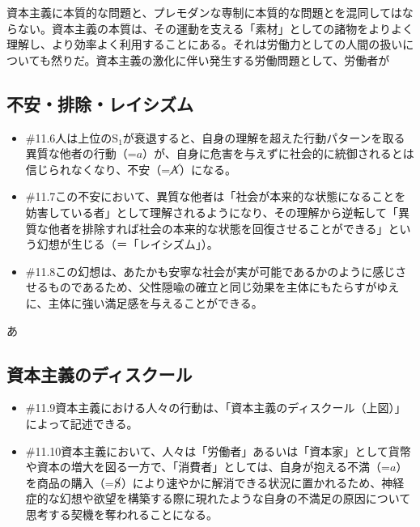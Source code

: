 資本主義に本質的な問題と、プレモダンな専制に本質的な問題とを混同してはならない。資本主義の本質は、その運動を支える「素材」としての諸物をよりよく理解し、より効率よく利用することにある。それは労働力としての人間の扱いについても然りだ。資本主義の激化に伴い発生する労働問題として、労働者が

\subsection{不安・排除・レイシズム}\label{ux4e0dux5b89ux6392ux9664ux30ecux30a4ux30b7ux30baux30e0}

\begin{note}{}
  \begin{itemize}
    \tightlist
    \item{\#11.6}人は上位の$\textrm{S}_1$が衰退すると、自身の理解を超えた行動パターンを取る異質な他者の行動（=$a$）が、自身に危害を与えずに社会的に統御されるとは信じられなくなり、不安（=$\cancel{\textrm{A}}$）になる。
    \item{\#11.7}この不安において、異質な他者は「社会が本来的な状態になることを妨害している者」として理解されるようになり、その理解から逆転して「異質な他者を排除すれば社会の本来的な状態を回復させることができる」という幻想が生じる（＝「レイシズム」）。
    \item{\#11.8}この幻想は、あたかも安寧な社会が実が可能であるかのように感じさせるものであるため、父性隠喩の確立と同じ効果を主体にもたらすがゆえに、主体に強い満足感を与えることができる。
  \end{itemize}
\end{note}

あ

\subsection{資本主義のディスクール}\label{ux8cc7ux672cux4e3bux7fa9ux306eux30c7ux30a3ux30b9ux30afux30fcux30eb}

\begin{note}{}
  \begin{itemize}
    \tightlist
    \item{\#11.9}資本主義における人々の行動は、「資本主義のディスクール（上図）」によって記述できる。
    \item{\#11.10}資本主義において、人々は「労働者」あるいは「資本家」として貨幣や資本の増大を図る一方で、「消費者」としては、自身が抱える不満（=$a$）を商品の購入（=$\cancel{\textrm{S}}$）により速やかに解消できる状況に置かれるため、神経症的な幻想や欲望を構築する際に現れたような自身の不満足の原因について思考する契機を奪われることになる。
  \end{itemize}
\end{note}


